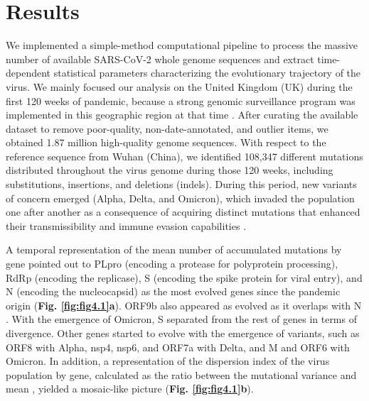 \section{Results}
We implemented a simple-method computational pipeline to process the massive number of available SARS-CoV-2 whole genome sequences and extract time-dependent statistical parameters characterizing the evolutionary trajectory of the virus. We mainly focused our analysis on the United Kingdom (UK) during the first 120 weeks of pandemic, because a strong genomic surveillance program was implemented in this geographic region at that time \cite{coguk2020integrated}. After curating the available dataset to remove poor-quality, non-date-annotated, and outlier items, we obtained 1.87 million high-quality genome sequences. With respect to the reference sequence from Wuhan (China), we identified 108,347 different mutations distributed throughout the virus genome during those 120 weeks, including substitutions, insertions, and deletions (indels). During this period, new variants of concern emerged (Alpha, Delta, and Omicron), which invaded the population one after another as a consequence of acquiring distinct mutations that enhanced their transmissibility and immune evasion capabilities \cite{tao2021biological}.

A temporal representation of the mean number of accumulated mutations by gene pointed out to PLpro (encoding a protease for polyprotein processing), RdRp (encoding the replicase), S (encoding the spike protein for viral entry), and N (encoding the nucleocapsid) as the most evolved genes since the pandemic origin (\textbf{Fig. \ref{fig:fig4.1}a}). ORF9b also appeared as evolved as it overlaps with N \cite{yang2021structural}. With the emergence of Omicron, S separated from the rest of genes in terms of divergence. Other genes started to evolve with the emergence of variants, such as ORF8 with Alpha, nsp4, nsp6, and ORF7a with Delta, and M and ORF6 with Omicron. In addition, a representation of the dispersion index of the virus population by gene, calculated as the ratio between the mutational variance and mean \cite{gillespie1984molecular}, yielded a mosaic-like picture (\textbf{Fig. \ref{fig:fig4.1}b}).

